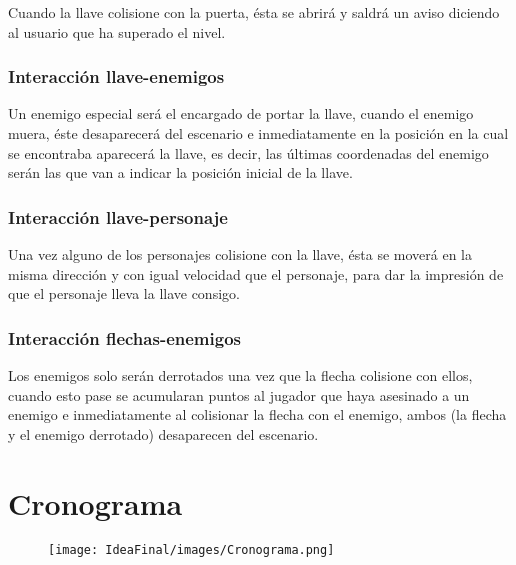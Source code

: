 \documentclass{article}
\begin{document}
Cuando la llave colisione con la puerta, ésta se abrirá y saldrá un aviso diciendo al usuario que ha superado el nivel.


\subsubsection{Interacción llave-enemigos}

Un enemigo especial será el encargado de portar la llave, cuando el enemigo muera, éste desaparecerá del escenario e inmediatamente en la posición en la cual se encontraba aparecerá la llave, es decir, las últimas coordenadas del enemigo serán las que van a indicar la posición inicial de la llave.


\subsubsection{Interacción llave-personaje}

Una vez alguno de los personajes colisione con la llave, ésta se moverá en la misma dirección y con igual velocidad que el personaje, para dar la impresión de que el personaje lleva la llave consigo.


\subsubsection{Interacción flechas-enemigos}

Los enemigos solo serán derrotados una vez que la flecha colisione con ellos, cuando esto pase se acumularan puntos al jugador que haya asesinado a un enemigo e inmediatamente al colisionar la flecha con el enemigo, ambos (la flecha y el enemigo derrotado) desaparecen del escenario. 


\section{Cronograma} \label{Cronograma}

\begin{figure}[h!]
    \centering
    \texttt{[image: IdeaFinal/images/Cronograma.png]}
\end{figure}
\end{document}

